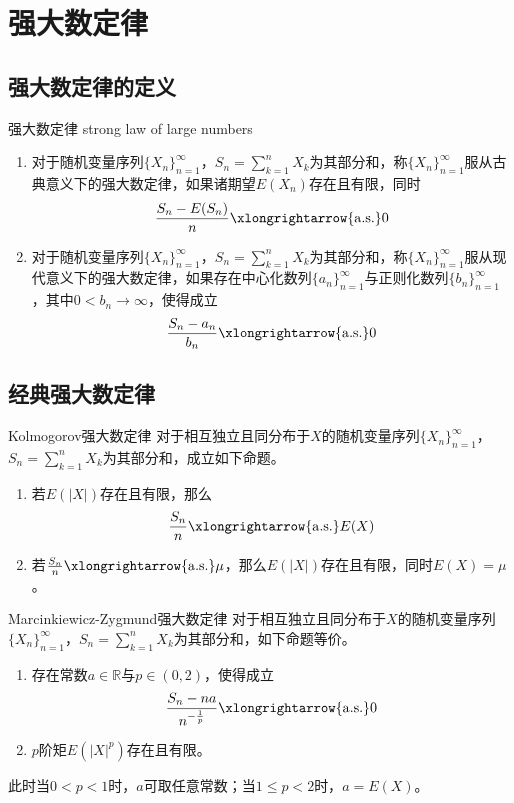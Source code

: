 \documentclass[lang = cn, scheme = chinese, thmcnt = section]{elegantbook}
\newcommand{\R}{\mathbb{R}}            %
\newcommand{\toas}{\xlongrightarrow{\mathrm{a.s.}}}
\newcommand{\dis}{\displaystyle}
\begin{document}
\section{强大数定律}

\subsection{强大数定律的定义}

\begin{definition}{强大数定律 strong law of large numbers}
	\begin{enumerate}
		\item 对于随机变量序列$\{ X_n \}_{n=1}^{\infty}$，$\dis S_n=\sum_{k=1}^{n}X_k$为其部分和，称$\{ X_n \}_{n=1}^{\infty}$服从古典意义下的强大数定律，如果诸期望$E(X_n)$存在且有限，同时%
		$$
		\frac{S_n-E(S_n)}{n}\toas 0
		$$
		\item 对于随机变量序列$\{ X_n \}_{n=1}^{\infty}$，$\dis S_n=\sum_{k=1}^{n}X_k$为其部分和，称$\{ X_n \}_{n=1}^{\infty}$服从现代意义下的强大数定律，如果存在中心化数列$\{ a_n \}_{n=1}^{\infty}$与正则化数列$\{ b_n \}_{n=1}^{\infty}$，其中$0<b_n\to \infty$，使得成立
		$$
		\frac{S_n-a_n}{b_n}\toas 0
		$$
	\end{enumerate}
\end{definition}

\subsection{经典强大数定律}

\begin{theorem}{Kolmogorov强大数定律}
	对于相互独立且同分布于$X$的随机变量序列$\{ X_n \}_{n=1}^{\infty}$，$\dis S_n=\sum_{k=1}^{n}X_k$为其部分和，成立如下命题。
	\begin{enumerate}
		\item 若$E(|X|)$存在且有限，那么%
		$$
		\frac{S_n}{n}\toas E(X)
		$$
		\item 若$\frac{S_n}{n}\toas \mu$，那么$E(|X|)$存在且有限，同时$E(X)=\mu$。
	\end{enumerate}
\end{theorem}

\begin{theorem}{Marcinkiewicz-Zygmund强大数定律}
	对于相互独立且同分布于$X$的随机变量序列$\{ X_n \}_{n=1}^{\infty}$，$\dis S_n=\sum_{k=1}^{n}X_k$为其部分和，如下命题等价。
	\begin{enumerate}
		\item 存在常数$a\in\R$与$p\in(0,2)$，使得成立%
		$$
		\frac{S_n-na}{n^{-\frac{1}{p}}}\toas 0
		$$
		\item $p$阶矩$E(|X|^p)$存在且有限。
	\end{enumerate}
	此时当$0<p<1$时，$a$可取任意常数；当$1\le p<2$时，$a=E(X)$。
\end{theorem}
\end{document}

